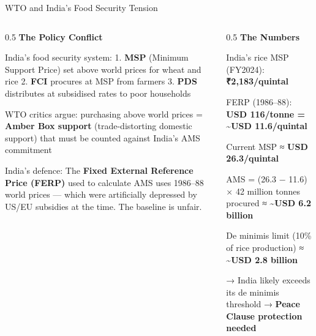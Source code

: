 \documentclass[
  ignorenonframetext,
  aspectratio=169,
]{beamer}
\makeatletter
\let\quarto@originallabel\label
\DeclareRobustCommand*{\label}[1]{\quarto@originallabel{#1}}
\makeatother
\begin{document}
\begin{frame}{WTO and India's Food Security Tension}
\label{wto-and-indias-food-security-tension}
\begin{columns}[T]
\begin{column}{0.5\linewidth}
\textbf{The Policy Conflict}

India's food security system: 1. \textbf{MSP} (Minimum Support Price)
set above world prices for wheat and rice 2. \textbf{FCI} procures at
MSP from farmers 3. \textbf{PDS} distributes at subsidised rates to poor
households

WTO critics argue: purchasing above world prices = \textbf{Amber Box
support} (trade-distorting domestic support) that must be counted
against India's AMS commitment

India's defence: The \textbf{Fixed External Reference Price (FERP)} used
to calculate AMS uses 1986--88 world prices --- which were artificially
depressed by US/EU subsidies at the time. The baseline is unfair.
\end{column}

\begin{column}{0.5\linewidth}
\textbf{The Numbers}

India's rice MSP (FY2024): \textbf{₹2,183/quintal}

FERP (1986--88): \textbf{USD 116/tonne = \textasciitilde USD
11.6/quintal}

Current MSP ≈ \textbf{USD 26.3/quintal}

AMS = (26.3 − 11.6) × 42 million tonnes procured ≈
\textbf{\textasciitilde USD 6.2 billion}

De minimis limit (10\% of rice production) ≈ \textbf{\textasciitilde USD
2.8 billion}

→ India likely exceeds its de minimis threshold → \textbf{Peace Clause
protection needed}
\end{column}
\end{columns}
\end{frame}
\end{document}
